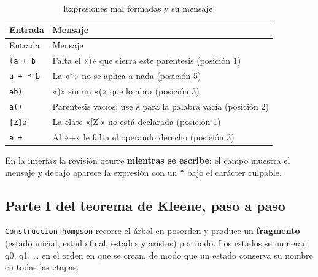 \begin{longtable}[]{@{}ll@{}}
\caption{Expresiones mal formadas y su mensaje.}\tabularnewline
\toprule\noalign{}
Entrada & Mensaje \\
\midrule\noalign{}
\endfirsthead
\toprule\noalign{}
Entrada & Mensaje \\
\midrule\noalign{}
\endhead
\bottomrule\noalign{}
\endlastfoot
\texttt{(a\ +\ b} & Falta el «)» que cierra este paréntesis (posición 1) \\
\texttt{a\ +\ *\ b} & La «*» no se aplica a nada (posición 5) \\
\texttt{ab)} & «)» sin un «(» que lo abra (posición 3) \\
\texttt{a()} & Paréntesis vacíos; use λ para la palabra vacía (posición 2) \\
\texttt{{[}Z{]}a} & La clase «{[}Z{]}» no está declarada (posición 1) \\
\texttt{a\ +} & Al «+» le falta el operando derecho (posición 3) \\
\end{longtable}

En la interfaz la revisión ocurre \textbf{mientras se escribe}: el campo muestra el mensaje y debajo aparece la expresión con un \texttt{\^{}} bajo el carácter culpable.


\hypertarget{parte-i-del-teorema-de-kleene-paso-a-paso}{%
\subsection{Parte I del teorema de Kleene, paso a paso}\label{parte-i-del-teorema-de-kleene-paso-a-paso}}

\texttt{ConstruccionThompson} recorre el árbol en posorden y produce un \textbf{fragmento} (estado inicial, estado final, estados y aristas) por nodo. Los estados se numeran q0, q1, \ldots{} en el orden en que se crean, de modo que un estado conserva su nombre en todas las etapas.

